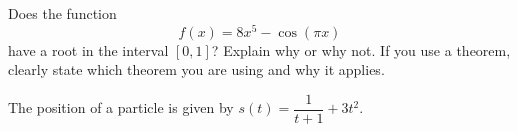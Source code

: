 \documentclass[addpoints,12pt]{exam}
\newcommand{\ds}{\displaystyle}
\begin{document}
\begin{questions}

\newpage






\question[6] Does the function $$f(x) = 8x^5 - \cos(\pi x) $$ have a root in the interval $[0,1]$?
Explain why or why not. If you use a theorem, clearly state which theorem you are using and
why it applies.


\newpage

\question The position of a particle is given by $s(t) = \dfrac{1}{t+1} + 3t^2.$


   \newpage






\newpage









\end{questions}
\end{document}
